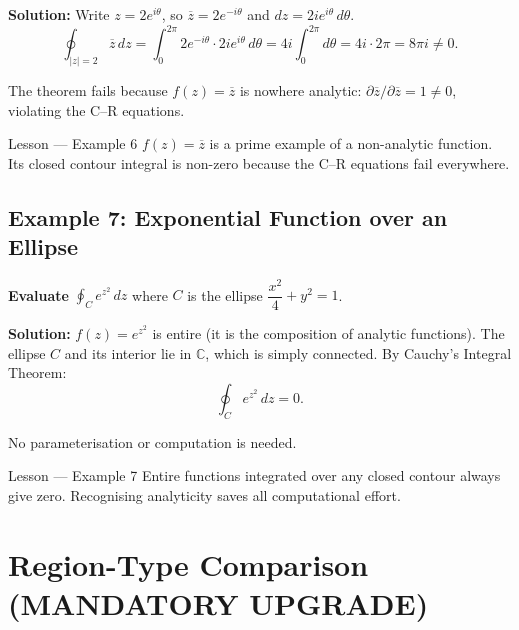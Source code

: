 \documentclass[12pt,a4paper]{article}
\begin{document}
\textbf{Solution:}
Write $z = 2e^{i\theta}$, so $\overline{z} = 2e^{-i\theta}$ and $dz = 2ie^{i\theta}\,d\theta$.
\[
  \oint_{|z|=2} \overline{z}\,dz
  = \int_{0}^{2\pi} 2e^{-i\theta} \cdot 2ie^{i\theta}\,d\theta
  = 4i\int_{0}^{2\pi} d\theta
  = 4i \cdot 2\pi
  = 8\pi i \neq 0.
\]

The theorem fails because $f(z) = \overline{z}$ is nowhere analytic:
$\partial \overline{z}/\partial \overline{z} = 1 \neq 0$, violating the C--R equations.

\begin{learnbox}{Lesson --- Example 6}
$f(z) = \overline{z}$ is a prime example of a non-analytic function.
Its closed contour integral is non-zero because the C--R equations fail everywhere.
\end{learnbox}

\subsection*{Example 7: Exponential Function over an Ellipse}

\textbf{Evaluate} $\displaystyle\oint_{C} e^{z^2}\,dz$
where $C$ is the ellipse $\dfrac{x^2}{4} + y^2 = 1$.

\textbf{Solution:}
$f(z) = e^{z^2}$ is entire (it is the composition of analytic functions).
The ellipse $C$ and its interior lie in $\mathbb{C}$, which is simply connected.
By Cauchy's Integral Theorem:
\[
  \oint_{C} e^{z^2}\,dz = 0.
\]

No parameterisation or computation is needed.

\begin{learnbox}{Lesson --- Example 7}
Entire functions integrated over any closed contour always give zero.
Recognising analyticity saves all computational effort.
\end{learnbox}

\section{Region-Type Comparison (MANDATORY UPGRADE)}
\end{document}
